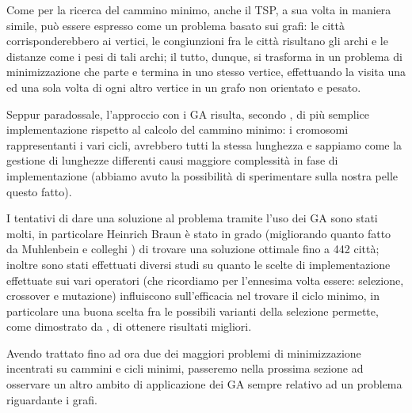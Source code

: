 Come per la ricerca del cammino minimo, anche il TSP, a sua volta in maniera simile, pu\`o essere espresso come un problema basato sui grafi: le citt\`a corrisponderebbero ai vertici, le congiunzioni fra le citt\`a risultano gli archi e le distanze come i pesi di tali archi; il tutto, dunque, si trasforma in un problema di minimizzazione che parte e termina in uno stesso vertice, effettuando la visita una ed una sola volta di ogni altro vertice in un grafo non orientato e pesato.
\vspace{3mm}

Seppur paradossale, l'approccio con i GA risulta, secondo \cite{path4}, di pi\`u semplice implementazione rispetto al calcolo del cammino minimo: i cromosomi rappresentanti i vari cicli, avrebbero tutti la stessa lunghezza e sappiamo come la gestione di lunghezze differenti causi maggiore complessit\`a in fase di implementazione (abbiamo avuto la possibilit\`a di sperimentare sulla nostra pelle questo fatto).
\vspace{3mm}

I tentativi di dare una soluzione al problema tramite l'uso dei GA sono stati molti, in particolare Heinrich Braun \cite{tsp2} \`e stato in grado (migliorando quanto fatto da Muhlenbein e colleghi \cite{tsp3}) di trovare una soluzione ottimale fino a 442 citt\`a; inoltre sono stati effettuati diversi studi su quanto le scelte di implementazione effettuate sui vari operatori \cite{tsp5} (che ricordiamo per l'ennesima volta essere: selezione, crossover e mutazione) influiscono sull'efficacia nel trovare il ciclo minimo, in particolare una buona scelta fra le possibili varianti della selezione permette, come dimostrato da \cite{tsp4}, di ottenere risultati migliori.
\vspace{3mm}

Avendo trattato fino ad ora due dei maggiori problemi di minimizzazione incentrati su cammini e cicli minimi, passeremo nella prossima sezione ad osservare un altro ambito di applicazione dei GA sempre relativo ad un problema riguardante i grafi.

